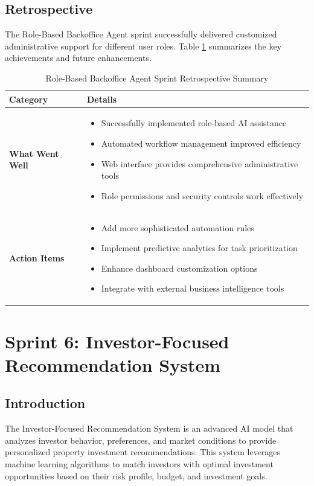 \subsection{Retrospective}

The Role-Based Backoffice Agent sprint successfully delivered customized administrative support for different user roles. Table \ref{tab:backoffice-retrospective} summarizes the key achievements and future enhancements.

\begin{table}[htbp]
    \centering
    \begin{tabular}{|p{3cm}|p{10cm}|}
        \hline
        \textbf{Category} & \textbf{Details} \\
        \hline
        \textbf{What Went Well} & 
        \begin{itemize}
            \item Successfully implemented role-based AI assistance
            \item Automated workflow management improved efficiency
            \item Web interface provides comprehensive administrative tools
            \item Role permissions and security controls work effectively
        \end{itemize} \\
        \hline
        \textbf{Action Items} & 
        \begin{itemize}
            \item Add more sophisticated automation rules
            \item Implement predictive analytics for task prioritization
            \item Enhance dashboard customization options
            \item Integrate with external business intelligence tools
        \end{itemize} \\
        \hline
    \end{tabular}
    \caption{Role-Based Backoffice Agent Sprint Retrospective Summary}
    \label{tab:backoffice-retrospective}
\end{table}

\newpage
\section{Sprint 6: Investor-Focused Recommendation System}
\subsection*{Introduction}
The Investor-Focused Recommendation System is an advanced AI model that analyzes investor behavior, preferences, and market conditions to provide personalized property investment recommendations. This system leverages machine learning algorithms to match investors with optimal investment opportunities based on their risk profile, budget, and investment goals.


